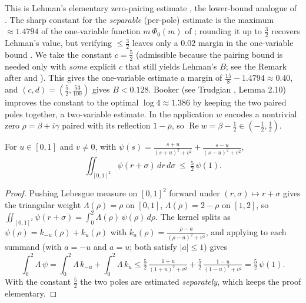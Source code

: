 \begin{remark}
This is Lehman's elementary zero-pairing estimate \cite{Lehman1970}, the
lower-bound analogue of . The sharp constant for the
\emph{separable} (per-pole) estimate is the maximum $\approx1.4794$ of the
one-variable function $m\,\Phi_0(m)$ of ; rounding it up to
$\tfrac32$ recovers Lehman's value, but verifying $\le\tfrac32$ leaves only a
$0.02$ margin in the one-variable bound . We take the
constant $c=\tfrac52$ (admissible because the pairing bound is needed only with
\emph{some} explicit $c$ that still yields Lehman's $B$; see the Remark after
 and ). This gives the one-variable
estimate a margin of $\tfrac{15}8-1.4794\approx0.40$, and
$(c,d)=(\tfrac52,\tfrac{53}{100})$ gives $B<0.128$. Booker (see Trudgian
\cite{TrudgianTuring}, Lemma 2.10) improves the constant to the optimal
$\log4\approx1.386$ by keeping the two paired poles together, a two-variable
estimate. In the application $w$ encodes a nontrivial zero
$\rho=\beta+i\gamma$ paired with its reflection $1-\bar\rho$, so
$\operatorname{Re}w=\beta-\tfrac12\in(-\tfrac12,\tfrac12)$.
\end{remark}

\begin{lemma}
\label{lem:lb_booker_scalar}
\leanok
{}
For $u\in[0,1]$ and $v\neq0$, with
$\psi(s)=\tfrac{s+u}{(s+u)^2+v^2}+\tfrac{s-u}{(s-u)^2+v^2}$,
\[
  \iint_{[0,1]^2}\psi(r+\sigma)\,dr\,d\sigma\ \le\ \tfrac52\,\psi(1).
\]
\end{lemma}

\begin{proof}
\leanok
{}
Pushing Lebesgue measure on $[0,1]^2$ forward under $(r,\sigma)\mapsto r+\sigma$
gives the triangular weight $\Lambda(\rho)=\rho$ on $[0,1]$, $\Lambda(\rho)=2-\rho$
on $[1,2]$, so $\iint_{[0,1]^2}\psi(r+\sigma)=\int_0^2\Lambda(\rho)\,\psi(\rho)\,d\rho$.
The kernel splits as $\psi(\rho)=k_{-u}(\rho)+k_{u}(\rho)$ with
$k_a(\rho)=\tfrac{\rho-a}{(\rho-a)^2+v^2}$, and applying 
to each summand (with $a=-u$ and $a=u$; both satisfy $|a|\le1$) gives
\[
  \int_0^2\Lambda\,\psi
  =\int_0^2\Lambda\,k_{-u}+\int_0^2\Lambda\,k_{u}
  \le \tfrac52\,\tfrac{1+u}{(1+u)^2+v^2}+\tfrac52\,\tfrac{1-u}{(1-u)^2+v^2}
  =\tfrac52\,\psi(1).
\]
With the constant $\tfrac52$ the two poles are estimated \emph{separately}, which
keeps the proof elementary.
\end{proof}

